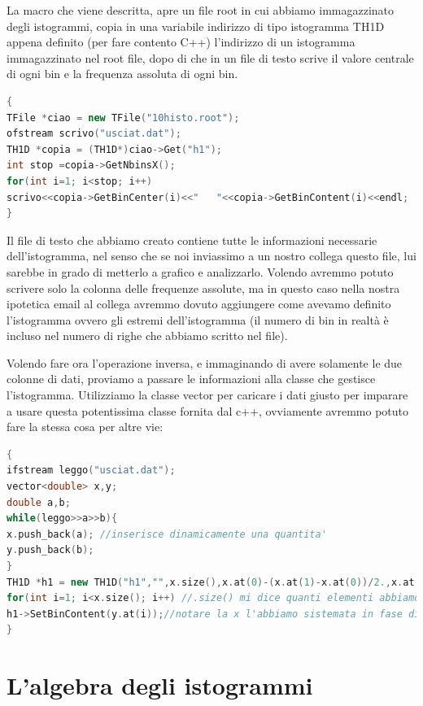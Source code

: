 \documentclass[11pt,fleqn]{book} %
\begin{document}
La macro che viene descritta, apre un file root in cui abbiamo immagazzinato degli istogrammi, copia in una variabile indirizzo di tipo istogramma TH1D appena definito (per fare contento C++) l'indirizzo di un istogramma immagazzinato nel root file, dopo di che in un file di testo scrive il valore centrale di ogni bin e la frequenza assoluta di ogni bin. 

\begin{lstlisting}[language=c++]
{
TFile *ciao = new TFile("10histo.root");
ofstream scrivo("usciat.dat");
TH1D *copia = (TH1D*)ciao->Get("h1");
int stop =copia->GetNbinsX();
for(int i=1; i<stop; i++)
scrivo<<copia->GetBinCenter(i)<<"   "<<copia->GetBinContent(i)<<endl;
}
\end{lstlisting}

Il file di testo che abbiamo creato contiene tutte le informazioni necessarie dell'istogramma, nel senso che se noi inviassimo a un nostro collega questo file, lui sarebbe in grado di metterlo a grafico e analizzarlo. Volendo avremmo potuto scrivere solo la colonna delle frequenze assolute, ma in questo caso nella nostra ipotetica email al collega avremmo dovuto aggiungere come avevamo definito l'istogramma ovvero gli estremi dell'istogramma (il numero di bin in realtà è incluso nel numero di righe che abbiamo scritto nel file).


Volendo fare ora l'operazione inversa, e immaginando di avere solamente le due colonne di dati, proviamo a passare le informazioni alla classe che gestisce l'istogramma. Utilizziamo la classe vector per caricare i dati giusto per imparare a usare questa potentissima classe fornita dal c++, ovviamente avremmo potuto fare la stessa cosa per altre vie:

\begin{lstlisting}[language=c++]
{
ifstream leggo("usciat.dat");
vector<double> x,y;
double a,b;
while(leggo>>a>>b){
x.push_back(a); //inserisce dinamicamente una quantita'
y.push_back(b);
}
TH1D *h1 = new TH1D("h1","",x.size(),x.at(0)-(x.at(1)-x.at(0))/2.,x.at(a.size()-1)+(x.at(1)-x.at(0))/2.);
for(int i=1; i<x.size(); i++) //.size() mi dice quanti elementi abbiamo caricato
h1->SetBinContent(y.at(i));//notare la x l'abbiamo sistemata in fase di definizione
}
\end{lstlisting}

\section{L'algebra degli istogrammi}
\end{document}

